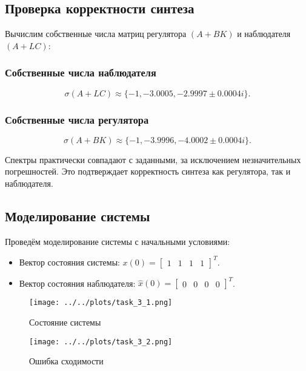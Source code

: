 \subsection{Проверка корректности синтеза}

Вычислим собственные числа матриц регулятора $(A + BK)$ и наблюдателя $(A + LC)$:

\subsubsection{Собственные числа наблюдателя}
\[
    \sigma(A + LC) \approx \{-1, -3.0005, -2.9997 \pm 0.0004i\}.
\]

\subsubsection{Собственные числа регулятора}
\[
    \sigma(A + BK) \approx \{-1, -3.9996, -4.0002 \pm 0.0004i\}.
\]

Спектры практически совпадают с заданными, за исключением незначительных погрешностей. Это подтверждает корректность синтеза как регулятора, так и наблюдателя.


\subsection{Моделирование системы}

Проведём моделирование системы с начальными условиями:
\begin{itemize}
    \item Вектор состояния системы: $x(0) = \begin{bmatrix} 1 & 1 & 1 & 1 \end{bmatrix}^T$.
    \item Вектор состояния наблюдателя: $\hat{x}(0) = \begin{bmatrix} 0 & 0 & 0 & 0 \end{bmatrix}^T$.
\end{itemize}

\begin{figure}[H]
    \centering
    \texttt{[image: ../../plots/task\_3\_1.png]}
    \caption{Состояние системы}
    \label{fig:task_3_state_system}
\end{figure}

\begin{figure}[H]
    \centering
    \texttt{[image: ../../plots/task\_3\_2.png]}
    \caption{Ошибка сходимости}
    \label{fig:task_3_error_system}
\end{figure}


